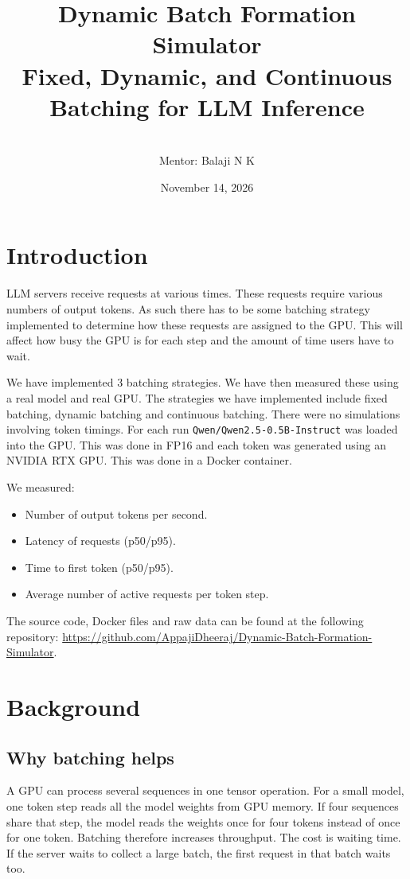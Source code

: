 \documentclass[12pt,a4paper]{article}
\title{Dynamic Batch Formation Simulator \\
Fixed, Dynamic, and Continuous Batching for LLM Inference}
\author{
\resizebox{0.95\textwidth}{!}{\begin{tabular}{cccc}
\textbf{Appaji Nagaraja Dheeraj} & \textbf{Rishinandan D R} & \textbf{Ashlesh Prabhu} & \textbf{Sachin Rohra} \\
241CS110 & 241CS145 & 241CS214 & 241CS251
\end{tabular}} \\[6pt]
Mentor: Balaji N K
}
\date{November 14, 2026}
\begin{document}
\maketitle

\section{Introduction}
LLM servers receive requests at various times. These requests require various numbers of output tokens. As such there has to be some batching strategy implemented to determine how these requests are assigned to the GPU. This will affect how busy the GPU is for each step and the amount of time users have to wait.

We have implemented 3 batching strategies. We have then measured these using a real model and real GPU. The strategies we have implemented include fixed batching, dynamic batching and continuous batching. There were no simulations involving token timings. For each run \texttt{Qwen/Qwen2.5-0.5B-Instruct} was loaded into the GPU. This was done in FP16 and each token was generated using an NVIDIA RTX GPU. This was done in a Docker container.

We measured:
\begin{itemize}
    \item Number of output tokens per second.
    \item Latency of requests (p50/p95).
    \item Time to first token (p50/p95).
    \item Average number of active requests per token step.
\end{itemize}
The source code, Docker files and raw data can be found at the following repository: \url{https://github.com/AppajiDheeraj/Dynamic-Batch-Formation-Simulator}.

\section{Background}

\subsection{Why batching helps}
A GPU can process several sequences in one tensor operation. For a small model, one token step reads all the model weights from GPU memory. If four sequences share that step, the model reads the weights once for four tokens instead of once for one token. Batching therefore increases throughput. The cost is waiting time. If the server waits to collect a large batch, the first request in that batch waits too.
\end{document}

